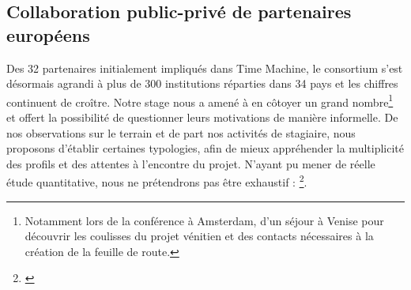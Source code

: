 \subsection{Collaboration public-privé de partenaires européens}
Des 32 partenaires initialement impliqués dans Time Machine, le consortium s'est désormais agrandi à plus de 300 institutions réparties dans 34 pays et les chiffres continuent de croître. Notre stage nous a amené à en côtoyer un grand nombre\footnote{Notamment lors de la conférence à Amsterdam, d'un séjour à Venise pour découvrir les coulisses du projet vénitien et des contacts nécessaires à la création de la feuille de route.} et offert la possibilité de questionner leurs motivations de manière informelle. De nos observations sur le terrain et de part nos activités de stagiaire, nous proposons d'établir certaines typologies, afin de mieux appréhender la multiplicité des profils et des attentes à l'encontre du projet. N'ayant pu mener de réelle étude quantitative, nous ne prétendrons pas être exhaustif : \footnote{\cite{time_machine_introduction_nodate}}. 
